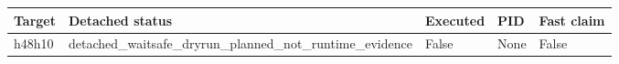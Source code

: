 {\small
\begin{tabular}{lllll}
\hline
Target & Detached status & Executed & PID & Fast claim \\
\hline
h48h10 & detached\_waitsafe\_dryrun\_planned\_not\_runtime\_evidence & False & None & False \\
\hline
\end{tabular}
}
